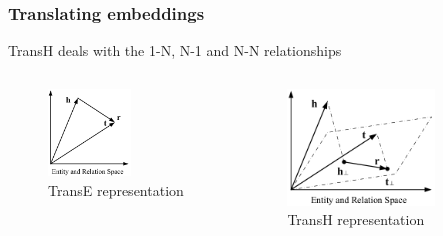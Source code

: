 \documentclass{beamer}
\begin{document}
\begin{frame}
  
  \frametitle{Translating embeddings}

  TransH deals with the 1-N, N-1 and N-N relationships

  \begin{columns}[c]
      \begin{figure}[h]
        \centering
        \includegraphics[width = 0.6\textwidth]{transe-figure.png}
        \caption{TransE representation}
      \end{figure}


      \begin{figure}[h]
        \centering
        \includegraphics[width = 0.8\textwidth]{transh-figure.png}
        \caption{TransH representation}
      \end{figure}
      
    
  \end{columns}

\end{frame}
\end{document}
